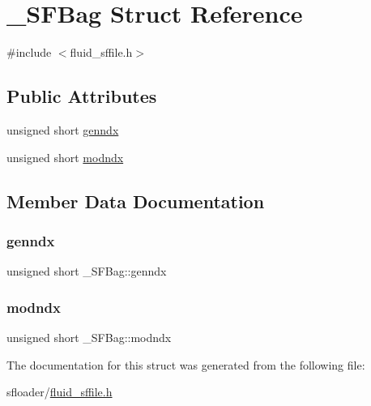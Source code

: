 \hypertarget{struct__SFBag}{}\section{\+\_\+\+S\+F\+Bag Struct Reference}
\label{struct__SFBag}


{\ttfamily \#include $<$fluid\+\_\+sffile.\+h$>$}

\subsection*{Public Attributes}
\begin{DoxyCompactItemize}
\item 
unsigned short \hyperlink{struct__SFBag_a366736acdb535b648afe177a8f7ffa4d}{genndx}
\item 
unsigned short \hyperlink{struct__SFBag_a6051b8dda6779c4bb0eeb82c287cbccf}{modndx}
\end{DoxyCompactItemize}


\subsection{Member Data Documentation}
\mbox{\label{struct__SFBag_a366736acdb535b648afe177a8f7ffa4d}} 
\subsubsection{\texorpdfstring{genndx}{genndx}}
{\footnotesize\ttfamily unsigned short \+\_\+\+S\+F\+Bag\+::genndx}

\mbox{\label{struct__SFBag_a6051b8dda6779c4bb0eeb82c287cbccf}} 
\subsubsection{\texorpdfstring{modndx}{modndx}}
{\footnotesize\ttfamily unsigned short \+\_\+\+S\+F\+Bag\+::modndx}



The documentation for this struct was generated from the following file\+:\begin{DoxyCompactItemize}
\item 
sfloader/\hyperlink{fluid__sffile_8h}{fluid\+\_\+sffile.\+h}\end{DoxyCompactItemize}
